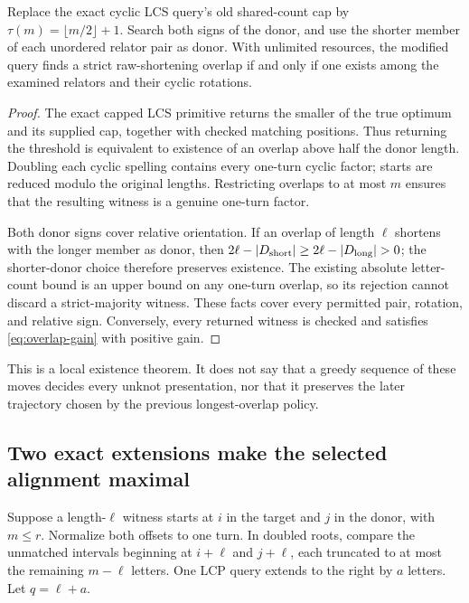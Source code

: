 \begin{theorem}
Replace the exact cyclic LCS query's old shared-count cap by
$\tau(m)=\lfloor m/2\rfloor+1$. Search both signs of the donor, and use the
shorter member of each unordered relator pair as donor. With unlimited
resources, the modified query finds a strict raw-shortening overlap if and
only if one exists among the examined relators and their cyclic rotations.
\label{thm:witness-existence}
\end{theorem}
\begin{proof}
The exact capped LCS primitive returns the smaller of the true optimum and
its supplied cap, together with checked matching positions. Thus returning
the threshold is equivalent to existence of an overlap above half the donor
length. Doubling each cyclic spelling contains every one-turn cyclic factor;
starts are reduced modulo the original lengths. Restricting overlaps to at
most $m$ ensures that the resulting witness is a genuine one-turn factor.

Both donor signs cover relative orientation. If an overlap of length $\ell$
shortens with the longer member as donor, then
$2\ell-|D_{\rm short}|\geq2\ell-|D_{\rm long}|>0$; the shorter-donor
choice therefore preserves existence. The existing absolute letter-count
bound is an upper bound on any one-turn overlap, so its rejection cannot
discard a strict-majority witness. These facts cover every permitted pair,
rotation, and relative sign. Conversely, every returned witness is checked
and satisfies \eqref{eq:overlap-gain} with positive gain.
\end{proof}

This is a local existence theorem. It does not say that a greedy sequence
of these moves decides every unknot presentation, nor that it preserves the
later trajectory chosen by the previous longest-overlap policy.

\subsection{Two exact extensions make the selected alignment maximal}

Suppose a length-$\ell$ witness starts at $i$ in the target and $j$ in the
donor, with $m\leq r$. Normalize both offsets to one turn. In doubled roots,
compare the unmatched intervals beginning at $i+\ell$ and $j+\ell$, each
truncated to at most the remaining $m-\ell$ letters. One LCP query extends
to the right by $a$ letters. Let $q=\ell+a$.


